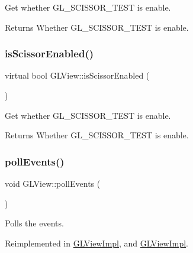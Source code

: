 Get whether G\+L\+\_\+\+S\+C\+I\+S\+S\+O\+R\+\_\+\+T\+E\+ST is enable.

\begin{DoxyReturn}{Returns}
Whether G\+L\+\_\+\+S\+C\+I\+S\+S\+O\+R\+\_\+\+T\+E\+ST is enable. 
\end{DoxyReturn}
\mbox{\label{classGLView_ae7de84c958af33c5e3f049014928f242}} 
\subsubsection{\texorpdfstring{is\+Scissor\+Enabled()}{isScissorEnabled()}\hspace{0.1cm}{\footnotesize\ttfamily [2/2]}}
{\footnotesize\ttfamily virtual bool G\+L\+View\+::is\+Scissor\+Enabled (\begin{DoxyParamCaption}{ }\end{DoxyParamCaption})\hspace{0.3cm}{\ttfamily [virtual]}}

Get whether G\+L\+\_\+\+S\+C\+I\+S\+S\+O\+R\+\_\+\+T\+E\+ST is enable.

\begin{DoxyReturn}{Returns}
Whether G\+L\+\_\+\+S\+C\+I\+S\+S\+O\+R\+\_\+\+T\+E\+ST is enable. 
\end{DoxyReturn}
\mbox{\label{classGLView_a707854960055e05a3841d4b8cf88f9ce}} 
\subsubsection{\texorpdfstring{poll\+Events()}{pollEvents()}\hspace{0.1cm}{\footnotesize\ttfamily [1/2]}}
{\footnotesize\ttfamily void G\+L\+View\+::poll\+Events (\begin{DoxyParamCaption}{ }\end{DoxyParamCaption})\hspace{0.3cm}{\ttfamily [virtual]}}

Polls the events. 

Reimplemented in \hyperlink{classGLViewImpl_aafbe949f616506c1faeb090fe9456bcc}{G\+L\+View\+Impl}, and \hyperlink{classGLViewImpl_aafbe949f616506c1faeb090fe9456bcc}{G\+L\+View\+Impl}.

